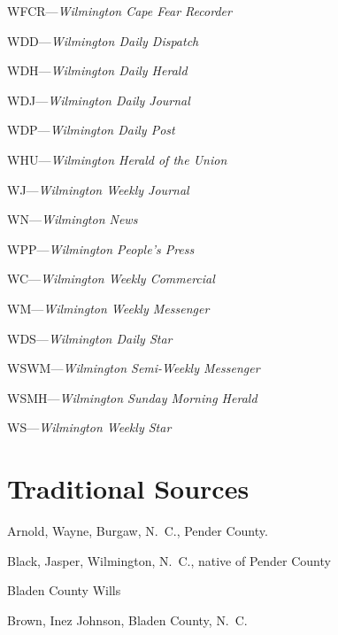 \documentclass[11pt, a5paper, openright]{book}
\begin{document}
\begin{thebibliography}{99}
  WFCR---\emph{Wilmington Cape Fear Recorder}

  WDD---\emph{Wilmington Daily Dispatch}

  WDH---\emph{Wilmington Daily Herald}

  WDJ---\emph{Wilmington Daily Journal}

  WDP---\emph{Wilmington Daily Post}

  WHU---\emph{Wilmington Herald of the Union}

  WJ---\emph{Wilmington Weekly Journal}

  WN---\emph{Wilmington News}

  WPP---\emph{Wilmington People's Press}

  WC---\emph{Wilmington Weekly Commercial}

  WM---\emph{Wilmington Weekly Messenger}

  WDS---\emph{Wilmington Daily Star}

  WSWM---\emph{Wilmington Semi-Weekly Messenger}

  WSMH---\emph{Wilmington Sunday Morning Herald}

  WS---\emph{Wilmington Weekly Star}

\section*{Traditional Sources}

  Arnold, Wayne, Burgaw, N.~C., Pender County.

  Black, Jasper, Wilmington, N.~C., native of Pender County

  Bladen County Wills

  Brown, Inez Johnson, Bladen County, N.~C.


\end{thebibliography}
\end{document}

